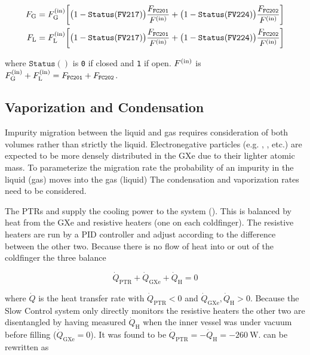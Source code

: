 \begin{subequations}
\begin{align}
F_{\mathrm{G}} &= F_{\mathrm{G}}^{(\mathrm{in})} \bigg[ \big(1 - \mathtt{Status(FV217)}\big) \frac{F_{\mathtt{FC201}}}{F^{(\mathrm{in})}} +
\big(1 - \mathtt{Status(FV224)}\big) \frac{F_{\mathtt{FC202}}}{F^{(\mathrm{in})}} \bigg]
\\
F_{\mathrm{L}} &= F_{\mathrm{L}}^{(\mathrm{in})} \bigg[ \big(1 - \mathtt{Status(FV217)}\big) \frac{F_{\mathtt{FC201}}}{F^{(\mathrm{in})}} +
\big(1 - \mathtt{Status(FV224)}\big) \frac{F_{\mathtt{FC202}}}{F^{(\mathrm{in})}} \bigg]
\end{align}
\end{subequations}

\noindent where $\mathtt{Status()}$ is \texttt{0} if closed and \texttt{1} if open.  $F^{(\mathrm{in})}$ is
$F_{\mathrm{G}}^{(\mathrm{in})} + F_{\mathrm{L}}^{(\mathrm{in})} = F_{\mathtt{FC201}} + F_{\mathtt{FC202}}$.



\subsection{Vaporization and Condensation}
\label{subsec:electron_lifetime_model_vap_and_cond}
Impurity migration between the liquid and gas requires consideration of both volumes rather than strictly the liquid.  Electronegative
particles (e.g. , , etc.) are expected to be more densely distributed in the GXe due to their lighter atomic mass.  To
parameterize the migration rate the probability of an impurity in the liquid (gas) moves into the gas (liquid) The condensation and
vaporization rates need to be considered.

The PTRs and  supply the cooling power to the system ().  This is balanced by heat from the GXe and
resistive heaters (one on each coldfinger).  The resistive heaters are run by a PID controller and adjust according to the difference
between the other two.  Because there is no flow of heat into or out of the coldfinger the three balance

\begin{equation}
\dot{Q}_{\mathrm{PTR}} + \dot{Q}_{\mathrm{GXe}} + \dot{Q}_{\mathrm{H}} = 0
\label{eq:electron_lifetime_model_vap_and_cond_heat_cons}
\end{equation}

\noindent where $\dot{Q}$ is the heat transfer rate with $\dot{Q}_{\mathrm{PTR}} < 0$ and
$\dot{Q}_{\mathrm{GXe}}, \dot{Q}_{\mathrm{H}} > 0$.  Because the Slow Control system only directly monitors the resistive heaters the
other two are disentangled by having measured $\dot{Q}_{\mathrm{H}}$ when the inner vessel was under vacuum before filling
($\dot{Q}_{\mathrm{GXe}} = 0$).  It was found
to be $\dot{Q}_{\mathrm{PTR}} = -\dot{Q}_{\mathrm{H}} = -260\ \mathrm{W}$.   can
be rewritten as

